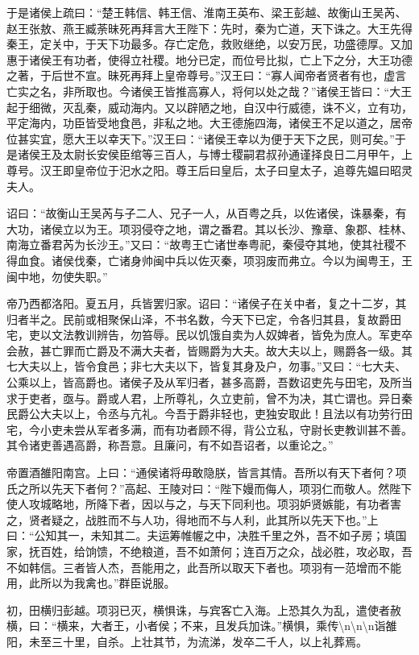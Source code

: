 \documentclass[]{article}
\begin{document}
于是诸侯上疏曰：``楚王韩信、韩王信、淮南王英布、梁王彭越、故衡山王吴芮、赵王张敖、燕王臧荼昧死再拜言大王陛下：先时，秦为亡道，天下诛之。大王先得秦王，定关中，于天下功最多。存亡定危，救败继绝，以安万民，功盛德厚。又加惠于诸侯王有功者，使得立社稷。地分已定，而位号比拟，亡上下之分，大王功德之著，于后世不宣。昧死再拜上皇帝尊号。''汉王曰：``寡人闻帝者贤者有也，虚言亡实之名，非所取也。今诸侯王皆推高寡人，将何以处之哉？''诸侯王皆曰：``大王起于细微，灭乱秦，威动海内。又以辟陋之地，自汉中行威德，诛不义，立有功，平定海内，功臣皆受地食邑，非私之地。大王德施四海，诸侯王不足以道之，居帝位甚实宜，愿大王以幸天下。''汉王曰：``诸侯王幸以为便于天下之民，则可矣。''于是诸侯王及太尉长安侯臣绾等三百人，与博士稷嗣君叔孙通谨择良日二月甲午，上尊号。汉王即皇帝位于汜水之阳。尊王后曰皇后，太子曰皇太子，追尊先媪曰昭灵夫人。

诏曰：``故衡山王吴芮与子二人、兄子一人，从百粤之兵，以佐诸侯，诛暴秦，有大功，诸侯立以为王。项羽侵夺之地，谓之番君。其以长沙、豫章、象郡、桂林、南海立番君芮为长沙王。''又曰：``故粤王亡诸世奉粤祀，秦侵夺其地，使其社稷不得血食。诸侯伐秦，亡诸身帅闽中兵以佐灭秦，项羽废而弗立。今以为闽粤王，王闽中地，勿使失职。''

帝乃西都洛阳。夏五月，兵皆罢归家。诏曰：``诸侯子在关中者，复之十二岁，其归者半之。民前或相聚保山泽，不书名数，今天下已定，令各归其县，复故爵田宅，吏以文法教训辨告，勿笞辱。民以饥饿自卖为人奴婢者，皆免为庶人。军吏卒会赦，甚亡罪而亡爵及不满大夫者，皆赐爵为大夫。故大夫以上，赐爵各一级。其七大夫以上，皆令食邑；非七大夫以下，皆复其身及户，勿事。''又曰：``七大夫、公乘以上，皆高爵也。诸侯子及从军归者，甚多高爵，吾数诏吏先与田宅，及所当求于吏者，亟与。爵或人君，上所尊礼，久立吏前，曾不为决，其亡谓也。异日秦民爵公大夫以上，令丞与亢礼。今吾于爵非轻也，吏独安取此！且法以有功劳行田宅，今小吏未尝从军者多满，而有功者顾不得，背公立私，守尉长吏教训甚不善。其令诸吏善遇高爵，称吾意。且廉问，有不如吾诏者，以重论之。''

帝置酒雒阳南宫。上曰：``通侯诸将毋敢隐朕，皆言其情。吾所以有天下者何？项氏之所以先天下者何？''高起、王陵对曰：``陛下嫚而侮人，项羽仁而敬人。然陛下使人攻城略地，所降下者，因以与之，与天下同利也。项羽妒贤嫉能，有功者害之，贤者疑之，战胜而不与人功，得地而不与人利，此其所以先天下也。''上曰：``公知其一，未知其二。夫运筹帷幄之中，决胜千里之外，吾不如子房；填国家，抚百姓，给饷馈，不绝粮道，吾不如萧何；连百万之众，战必胜，攻必取，吾不如韩信。三者皆人杰，吾能用之，此吾所以取天下者也。项羽有一范增而不能用，此所以为我禽也。''群臣说服。

初，田横归彭越。项羽已灭，横惧诛，与宾客亡入海。上恐其久为乱，遣使者赦横，曰：``横来，大者王，小者侯；不来，且发兵加诛。''横惧，乘传\textbackslash{}n\textbackslash{}n\textbackslash{}n诣雒阳，未至三十里，自杀。上壮其节，为流涕，发卒二千人，以上礼葬焉。
\end{document}
